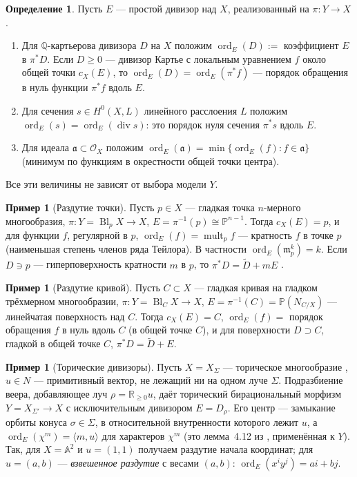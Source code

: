 \documentclass[11pt,a4paper]{article}
\theoremstyle{plain}
\theoremstyle{definition}
\newtheorem{definition}[theorem]{Определение}
\newtheorem{example}[theorem]{Пример}
\theoremstyle{remark}
\newcommand{\Q}{\mathbb{Q}}
\newcommand{\R}{\mathbb{R}}
\newcommand{\PP}{\mathbb{P}}
\newcommand{\A}{\mathbb{A}}
\newcommand{\cO}{\mathcal{O}}
\newcommand{\mm}{\mathfrak{m}}
\newcommand{\fa}{\mathfrak{a}}
\DeclareMathOperator{\divv}{div}
\DeclareMathOperator{\ord}{ord}
\DeclareMathOperator{\Bl}{Bl}
\DeclareMathOperator{\mult}{mult}
\begin{document}
\begin{definition}\label{def:ord-E}
Пусть $E$ --- простой дивизор над $X$, реализованный на $\pi\colon Y\to X$.
\begin{enumerate}
\item Для $\Q$-картьерова дивизора $D$ на $X$ положим $\ord_E(D):=$ коэффициент $E$ в $\pi^*D$.
Если $D\ge0$ --- дивизор Картье с локальным уравнением $f$ около общей точки $c_X(E)$, то
$\ord_E(D)=\ord_E(\pi^*f)$ --- порядок обращения в нуль функции $\pi^*f$ вдоль $E$.
\item Для сечения $s\in H^0(X,L)$ линейного расслоения $L$ положим $\ord_E(s)=\ord_E(\divv s)$:
это порядок нуля сечения $\pi^*s$ вдоль $E$.
\item Для идеала $\fa\subset\cO_X$ положим $\ord_E(\fa)=\min\{\ord_E(f):f\in\fa\}$ (минимум по
функциям в окрестности общей точки центра).
\end{enumerate}
Все эти величины не зависят от выбора модели $Y$.
\end{definition}

\begin{example}[Раздутие точки]\label{ex:blowup-point-ord}
Пусть $p\in X$ --- гладкая точка $n$-мерного многообразия, $\pi\colon Y=\Bl_pX\to X$,
$E=\pi^{-1}(p)\cong\PP^{n-1}$. Тогда $c_X(E)=p$, и для функции $f$, регулярной в $p$,
$\ord_E(f)=\mult_pf$ --- кратность $f$ в точке $p$ (наименьшая степень членов ряда Тейлора). В
частности $\ord_E(\mm_p^k)=k$. Если $D\ni p$ --- гиперповерхность кратности $m$ в $p$, то
$\pi^*D=\tilde D+mE$ \cite[предложение~7.4]{AG}.
\end{example}

\begin{example}[Раздутие кривой]
Пусть $C\subset X$ --- гладкая кривая на гладком трёхмерном многообразии, $\pi\colon Y=\Bl_CX\to X$,
$E=\pi^{-1}(C)=\PP(N_{C/X})$ --- линейчатая поверхность над $C$. Тогда $c_X(E)=C$,
$\ord_E(f)=$ порядок обращения $f$ в нуль вдоль $C$ (в общей точке $C$), и для поверхности
$D\supset C$, гладкой в общей точке $C$, $\pi^*D=\tilde D+E$.
\end{example}

\begin{example}[Торические дивизоры]
Пусть $X=X_\Sigma$ --- торическое многообразие \cite[\S\,4]{AG}, $u\in N$ --- примитивный
вектор, не лежащий ни на одном луче $\Sigma$. Подразбиение веера, добавляющее луч $\rho=\R_{\ge0}u$,
даёт торический бирациональный морфизм $Y=X_{\Sigma'}\to X$ с исключительным дивизором
$E=D_\rho$. Его центр --- замыкание орбиты конуса $\sigma\in\Sigma$, в относительной внутренности
которого лежит $u$, а $\ord_E(\chi^m)=\langle m,u\rangle$ для характеров $\chi^m$ (это
лемма~4.12 из \cite{AG}, применённая к $Y$). Так, для $X=\A^2$ и $u=(1,1)$ получаем раздутие
начала координат; для $u=(a,b)$ --- \emph{взвешенное раздутие} с весами $(a,b)$:
$\ord_E(x^iy^j)=ai+bj$.
\end{example}
\end{document}
